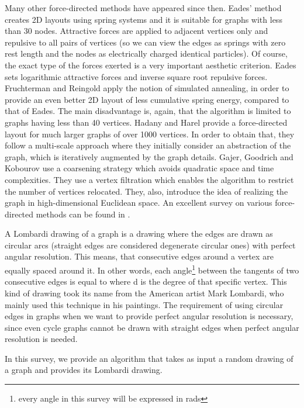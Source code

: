 \documentclass[10pt]{article}
\begin{document}
Many other force-directed methods have appeared since then. Eades' method \cite{eades} creates 2D layouts using spring systems and it is suitable for graphs with less than 30 nodes. Attractive forces are applied to adjacent vertices only and repulsive to all pairs of vertices (so we can view the edges as springs with zero rest length and the nodes as electrically charged identical particles). Of course, the exact type of the forces exerted is a very important aesthetic criterion. Eades sets logarithmic attractive forces and inverse square root repulsive forces. Fruchterman and Reingold \cite{DBLP:journals/spe/FruchtermanR91} apply the notion of simulated annealing, in order to provide an even better 2D layout of less cumulative spring energy, compared to that of Eades. The main disadvantage is, again, that the algorithm is limited to graphs having less than 40 vertices. Hadany and Harel \cite{HH99} provide a force-directed layout for much larger graphs of over 1000 vertices. In order to obtain that, they follow a multi-scale approach where they initially consider an abstraction of the graph, which is iteratively augmented by the graph details. Gajer, Goodrich and Kobourov \cite{DBLP:journals/comgeo/GajerGK04} use a coarsening strategy which avoids quadratic space and time complexities. They use a vertex filtration which enables the algorithm to restrict the number of vertices relocated. They, also, introduce the idea of realizing the graph in high-dimensional Euclidean space. An excellent survey on various force-directed methods can be found in \cite{tamassia-book}.

A Lombardi drawing of a graph is a drawing where the edges are drawn as circular arcs (straight edges are considered degenerate circular ones) with perfect angular resolution. This means, that consecutive edges around a vertex are equally spaced around it. In other words, each angle\footnote{ every angle in this survey will be expressed in rads} between the tangents of two consecutive edges is equal to  where d is the degree of that specific vertex. This kind of drawing took its name from the American artist Mark Lombardi, who mainly used this technique in his paintings. The requirement of using circular edges in graphs when we want to provide perfect angular resolution is necessary, since even cycle graphs cannot be drawn with straight edges when perfect angular resolution is needed.

In this survey, we provide an algorithm that takes as input a random drawing of a graph and provides its Lombardi drawing. 
\end{document}
